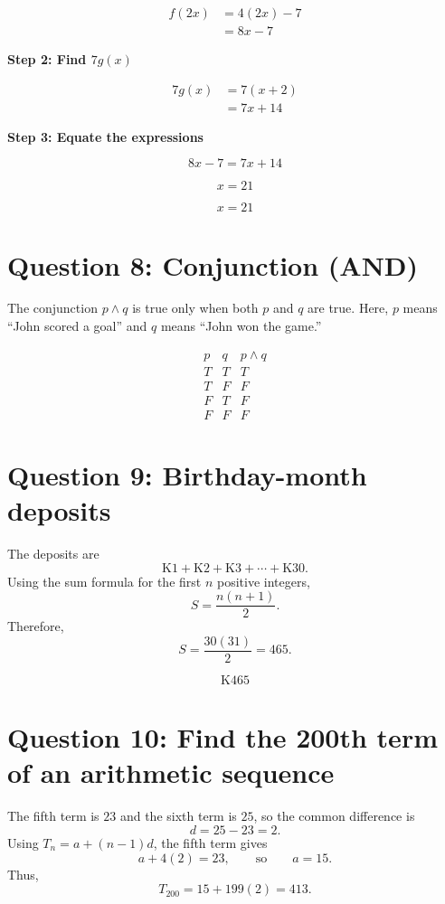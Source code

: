 \documentclass[11pt]{article}
\begin{document}
\[
\begin{aligned}
f(2x) &= 4(2x) - 7 \\
      &= 8x - 7
\end{aligned}
\]

\textbf{Step 2: Find \(7g(x)\)}

\[
\begin{aligned}
7g(x) &= 7(x+2) \\
     &= 7x + 14
\end{aligned}
\]

\textbf{Step 3: Equate the expressions}

\[
8x - 7 = 7x + 14
\]

\[
x = 21
\]

\[
\boxed{x = 21}
\]

\section*{Question 8: Conjunction (AND)}

The conjunction \(p\land q\) is true only when both \(p\) and \(q\) are true. Here, \(p\) means ``John scored a goal'' and \(q\) means ``John won the game.''

\[
\begin{array}{c|c|c}
p & q & p\land q\\
\hline
T & T & T\\
T & F & F\\
F & T & F\\
F & F & F
\end{array}
\]

\section*{Question 9: Birthday-month deposits}

The deposits are
\[
\mathrm{K}1+\mathrm{K}2+\mathrm{K}3+\cdots+\mathrm{K}30.
\]
Using the sum formula for the first \(n\) positive integers,
\[
S=\frac{n(n+1)}{2}.
\]
Therefore,
\[
S=\frac{30(31)}{2}=465.
\]

\[
\boxed{\mathrm{K}465}
\]

\section*{Question 10: Find the 200th term of an arithmetic sequence}

The fifth term is \(23\) and the sixth term is \(25\), so the common difference is
\[
d=25-23=2.
\]
Using \(T_n=a+(n-1)d\), the fifth term gives
\[
a+4(2)=23,
\qquad\text{so}\qquad
a=15.
\]
Thus,
\[
T_{200}=15+199(2)=413.
\]
\end{document}
